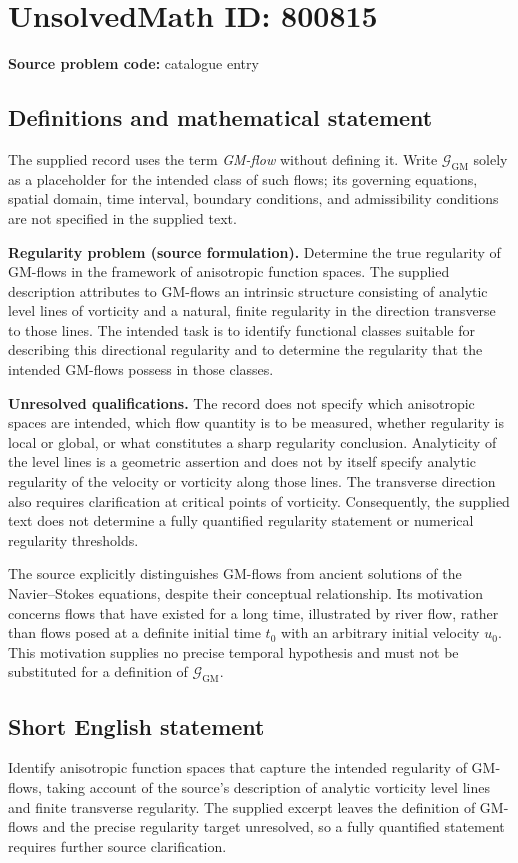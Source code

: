 \documentclass[11pt]{article}
\begin{document}
\section*{UnsolvedMath ID: 800815}
\textbf{Source problem code:} catalogue entry
\subsection{Definitions and mathematical statement}
The supplied record uses the term \emph{GM-flow} without defining it. Write \(\mathcal{G}_{\mathrm{GM}}\) solely as a placeholder for the intended class of such flows; its governing equations, spatial domain, time interval, boundary conditions, and admissibility conditions are not specified in the supplied text.

\textbf{Regularity problem (source formulation).} Determine the true regularity of GM-flows in the framework of anisotropic function spaces. The supplied description attributes to GM-flows an intrinsic structure consisting of analytic level lines of vorticity and a natural, finite regularity in the direction transverse to those lines. The intended task is to identify functional classes suitable for describing this directional regularity and to determine the regularity that the intended GM-flows possess in those classes.

\textbf{Unresolved qualifications.} The record does not specify which anisotropic spaces are intended, which flow quantity is to be measured, whether regularity is local or global, or what constitutes a sharp regularity conclusion. Analyticity of the level lines is a geometric assertion and does not by itself specify analytic regularity of the velocity or vorticity along those lines. The transverse direction also requires clarification at critical points of vorticity. Consequently, the supplied text does not determine a fully quantified regularity statement or numerical regularity thresholds.

The source explicitly distinguishes GM-flows from ancient solutions of the Navier--Stokes equations, despite their conceptual relationship. Its motivation concerns flows that have existed for a long time, illustrated by river flow, rather than flows posed at a definite initial time \(t_0\) with an arbitrary initial velocity \(u_0\). This motivation supplies no precise temporal hypothesis and must not be substituted for a definition of \(\mathcal{G}_{\mathrm{GM}}\).
\subsection{Short English statement}
Identify anisotropic function spaces that capture the intended regularity of GM-flows, taking account of the source's description of analytic vorticity level lines and finite transverse regularity. The supplied excerpt leaves the definition of GM-flows and the precise regularity target unresolved, so a fully quantified statement requires further source clarification.
\end{document}
